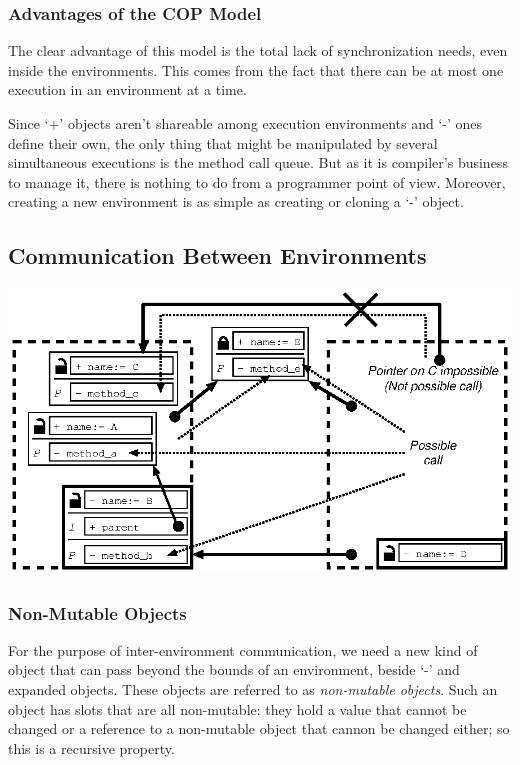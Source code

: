 \documentclass[11pt]{mybook}
\begin{document}
\subsubsection{Advantages of the COP Model}

The clear advantage of this model is the total lack of synchronization
needs, even inside the environments.  This comes from the fact that
there can be at most one execution in an environment at a time. 

Since `+' objects aren't shareable among execution environments and
`-' ones define their own, the only thing that might be manipulated by
several simultaneous executions is the method call queue.  But as it
is compiler's business to manage it, there is nothing to do from a
programmer point of view.  Moreover, creating a new environment is as
simple as creating or cloning a `-' object. 

\subsection{Communication Between Environments}

\begin{center}
\includegraphics{figures/cop-comm.ps}
\end{center}

\subsubsection{Non-Mutable Objects}

For the purpose of inter-environment communication, we need a new kind
of object that can pass beyond the bounds of an environment, beside
`-' and expanded objects.  These objects are referred to as
\emph{non-mutable objects}.  Such an object has slots that are all
non-mutable: they hold a value that cannot be changed or a reference
to a non-mutable object that cannon be changed either;  so this is a
recursive property. 
\end{document}
